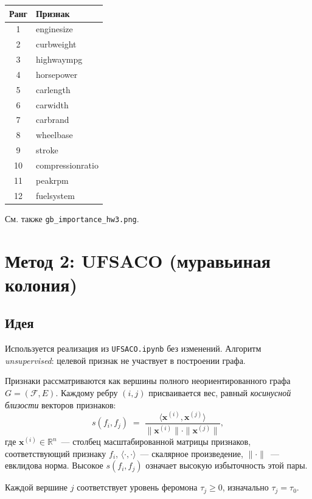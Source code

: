 \documentclass[12pt,a4paper]{article}
\begin{document}
\begin{center}
\begin{tabular}{cl}
\toprule
\textbf{Ранг} & \textbf{Признак} \\
\midrule
1  & enginesize \\
2  & curbweight \\
3  & highwaympg \\
4  & horsepower \\
5  & carlength \\
6  & carwidth \\
7  & carbrand \\
8  & wheelbase \\
9  & stroke \\
10 & compressionratio \\
11 & peakrpm \\
12 & fuelsystem \\
\bottomrule
\end{tabular}
\end{center}

См. также \texttt{gb\_importance\_hw3.png}.

\section{Метод 2: UFSACO (муравьиная колония)}

\subsection{Идея}
Используется реализация из \texttt{UFSACO.ipynb} без изменений. Алгоритм
\emph{unsupervised}: целевой признак не участвует в построении графа.

Признаки рассматриваются как вершины полного неориентированного графа
$G = (\mathcal{F}, E)$. Каждому ребру $(i,j)$ присваивается вес, равный
\emph{косинусной близости} векторов признаков:
\begin{equation}
  s(f_i, f_j) \;=\; \frac{\langle \mathbf{x}^{(i)}, \mathbf{x}^{(j)} \rangle}
                          {\|\mathbf{x}^{(i)}\| \cdot \|\mathbf{x}^{(j)}\|},
  \label{eq:cos}
\end{equation}
где $\mathbf{x}^{(i)} \in \mathbb{R}^n$~--- столбец масштабированной
матрицы признаков, соответствующий признаку $f_i$,
$\langle \cdot, \cdot \rangle$~--- скалярное произведение, $\|\cdot\|$~---
евклидова норма. Высокое $s(f_i,f_j)$ означает высокую избыточность
этой пары.

Каждой вершине $j$ соответствует уровень феромона $\tau_j \geq 0$,
изначально $\tau_j = \tau_0$.
\end{document}
